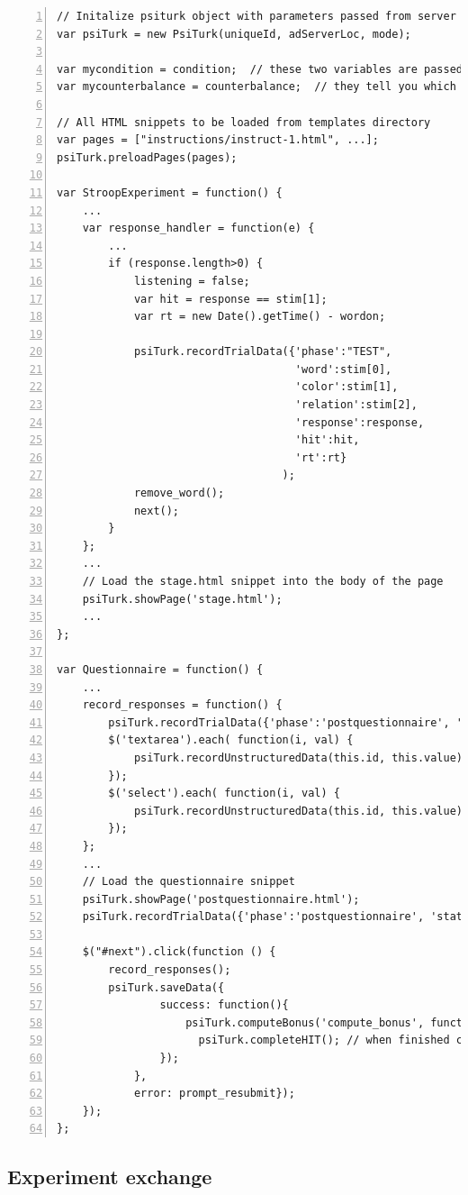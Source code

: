 \documentclass[twocolumn]{svjour3}          %
\begin{document}
\begin{lstlisting}[float=*,numbers=left,numberstyle=\small\color{gray},caption=Example experiment code (javascript)]
// Initalize psiturk object with parameters passed from server (see templates/exp.html)
var psiTurk = new PsiTurk(uniqueId, adServerLoc, mode);

var mycondition = condition;  // these two variables are passed by the psiturk server process
var mycounterbalance = counterbalance;  // they tell you which condition you have been assigned to

// All HTML snippets to be loaded from templates directory
var pages = ["instructions/instruct-1.html", ...];
psiTurk.preloadPages(pages);

var StroopExperiment = function() {
	...	
	var response_handler = function(e) {
		...
		if (response.length>0) {
			listening = false;
			var hit = response == stim[1];
			var rt = new Date().getTime() - wordon;

			psiTurk.recordTrialData({'phase':"TEST",
                                     'word':stim[0],
                                     'color':stim[1],
                                     'relation':stim[2],
                                     'response':response,
                                     'hit':hit,
                                     'rt':rt}
                                   );
			remove_word();
			next();
		}
	};
	...	
	// Load the stage.html snippet into the body of the page
	psiTurk.showPage('stage.html');
	...
};

var Questionnaire = function() {
	...
	record_responses = function() {
		psiTurk.recordTrialData({'phase':'postquestionnaire', 'status':'submit'});
		$('textarea').each( function(i, val) {
			psiTurk.recordUnstructuredData(this.id, this.value);
		});
		$('select').each( function(i, val) {
			psiTurk.recordUnstructuredData(this.id, this.value);		
		});
	};
	... 
	// Load the questionnaire snippet 
	psiTurk.showPage('postquestionnaire.html');
	psiTurk.recordTrialData({'phase':'postquestionnaire', 'status':'begin'});
	
	$("#next").click(function () {
	    record_responses();
	    psiTurk.saveData({
            	success: function(){
                	psiTurk.computeBonus('compute_bonus', function() { 
                	  psiTurk.completeHIT(); // when finished computing bonus, quit
                }); 
            }, 
            error: prompt_resubmit});
	});
};
\end{lstlisting}


\subsection{Experiment exchange}
\end{document}
